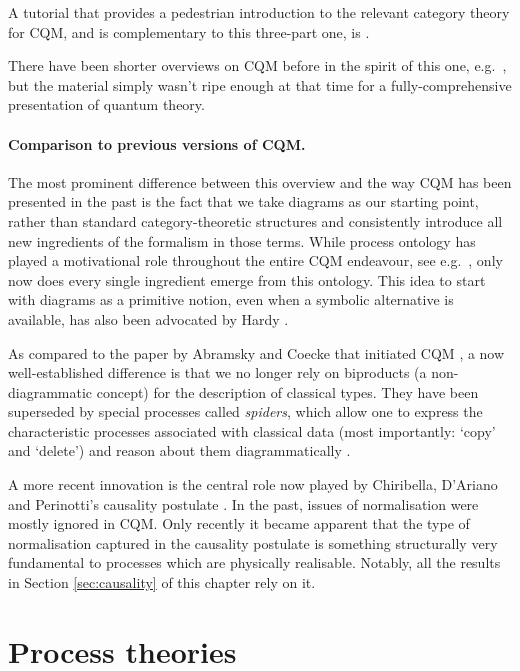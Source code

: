 \documentclass[12pt]{article}
\begin{document}
A tutorial that provides a pedestrian introduction to the relevant category theory for CQM, and is complementary to this three-part one, is \cite{CatsII}.   
  
There have been shorter overviews on CQM before in the spirit of this one, e.g.~\cite{Kindergarten, ContPhys}, but the material simply wasn't ripe enough at that time for a fully-comprehensive presentation of quantum theory. 

\paragraph{Comparison to previous versions of CQM.}  The most prominent difference between this overview and the way CQM has been presented in the past is the fact that we take diagrams as our starting point, rather than standard category-theoretic structures and consistently introduce all new ingredients of the formalism in those terms.  While process ontology has played a motivational role throughout the entire CQM endeavour, see e.g.~\cite{JTF}, only now does every single ingredient emerge from this ontology.  This idea to start with diagrams as a primitive notion, even when a symbolic alternative is available, has also been advocated by Hardy \cite{HardyJTF}.

As compared to the paper by Abramsky and Coecke that initiated CQM \cite{AC1}, a  now well-established difference is  that we no longer rely on biproducts  (a non-diagrammatic concept) for the description of classical types.  They have been superseded  by special processes called \textit{spiders},  which allow one to express the characteristic processes associated with classical data (most importantly: `copy' and `delete') and reason about them diagrammatically \cite{CPav, CPaqpav}.

A more recent  innovation is the central role  now played by Chiribella, D'Ariano and Perinotti's causality postulate \cite{chiri1}.  In the past, issues of normalisation were mostly ignored in CQM.  Only recently it became apparent that the type of normalisation captured in the causality postulate is something structurally very fundamental  to processes which are physically realisable. Notably, all the results in Section \ref{sec:causality} of this chapter rely on it.  


\section{Process theories}
\end{document}
